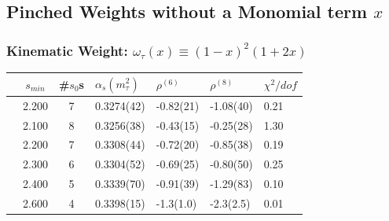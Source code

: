 \documentclass{beamer}
\begin{document}
\subsection{Pinched Weights without a Monomial term \(x\)}
\begin{frame}
  \frametitle{Kinematic Weight: \(\omega_\tau(x) \equiv (1-x)^2(1+2x)\)}
  \begin{tabularx}{\textwidth}{cccYYYY}
    \toprule
    & \(s_{min}\) & \#\(s_0\)s & \(\alpha_s(m_\tau^2)\) & \(\rho^{(6)}\) & \(\rho^{(8)}\) & \(\chi^2/dof\)  \\
    \midrule
    \parbox[t]{2mm}{}
    & 2.200 & 7 & 0.3274(42) & -0.82(21) & -1.08(40) & 0.21 \\
    \midrule
    \parbox[t]{2mm}{}
    & 2.100 & 8 & 0.3256(38) & -0.43(15) & -0.25(28) & 1.30 \\
    & 2.200 & 7 & 0.3308(44) & -0.72(20) & -0.85(38) & 0.19 \\
    & 2.300 & 6 & 0.3304(52) & -0.69(25) & -0.80(50) & 0.25 \\
    & 2.400 & 5 & 0.3339(70) & -0.91(39) & -1.29(83) & 0.10 \\
    & 2.600 & 4 & 0.3398(15) & -1.3(1.0) & -2.3(2.5) & 0.01  \\
    \bottomrule
  \end{tabularx}
\end{frame}
\end{document}
